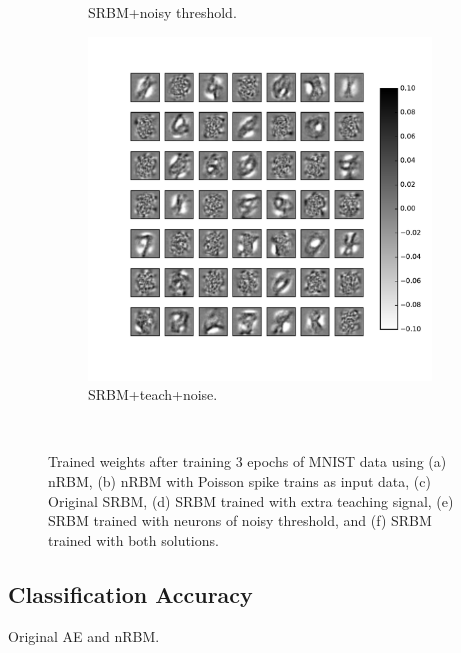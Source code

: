 \begin{figure}
\begin{subfigure}[t]{0.4\textwidth}
		\caption{SRBM+noisy threshold.}
	\end{subfigure}
	\begin{subfigure}[t]{0.4\textwidth}
		\includegraphics[width=\textwidth]{pics_sdlm/53_MNIST_SRBM_all/2_60000_0.pdf}
		\caption{SRBM+teach+noise.}
	\end{subfigure}\\
	\caption{Trained weights after training 3 epochs of MNIST data using (a) nRBM, (b) nRBM with Poisson spike trains as input data, (c) Original SRBM, (d) SRBM trained with extra teaching signal, (e) SRBM trained with neurons of noisy threshold, and (f) SRBM trained with both solutions.}
\end{figure}

\subsection{Classification Accuracy}
Original AE and nRBM.

